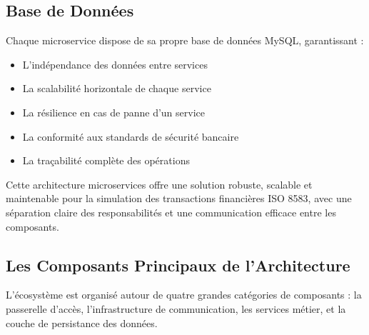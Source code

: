 \subsection{Base de Données}
Chaque microservice dispose de sa propre base de données MySQL, garantissant :
\begin{itemize}[label=\textbullet]
    \item L'indépendance des données entre services
    \item La scalabilité horizontale de chaque service
    \item La résilience en cas de panne d'un service
    \item La conformité aux standards de sécurité bancaire
    \item La traçabilité complète des opérations
\end{itemize}

Cette architecture microservices offre une solution robuste, scalable et maintenable pour la simulation des transactions financières ISO 8583, avec une séparation claire des responsabilités et une communication efficace entre les composants.

\subsection{Les Composants Principaux de l'Architecture}

L'écosystème est organisé autour de quatre grandes catégories de composants : la passerelle d'accès, l'infrastructure de communication, les services métier, et la couche de persistance des données.

